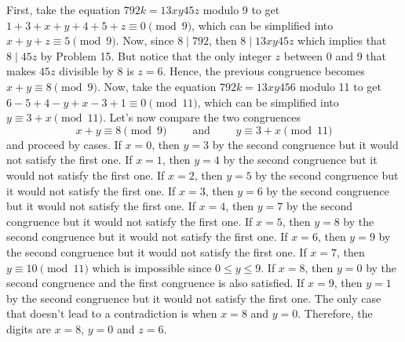 \begin{solution}
    First, take the equation $792k = 13xy45z$ modulo 9 to get $1 + 3 + x + y + 4 + 5 + z \equiv 0 \pmod 9$, which can be simplified into $x + y + z \equiv 5 \pmod 9$. Now, since $8 \mid 792$, then $8 \mid 13xy45z$ which implies that $8 \mid 45z$ by Problem 15. But notice that the only integer $z$ between 0 and 9 that makes $45z$ divisible by 8 is $z = 6$. Hence, the previous congruence becomes $x + y \equiv 8 \pmod 9$. Now, take the equation $792k = 13xy456$ modulo 11 to get $6 - 5 + 4 - y + x - 3 + 1 \equiv 0 \pmod{11}$, which can be simplified into $y \equiv 3 + x \pmod{11}$. Let's now compare the two congruences
    $$x + y \equiv 8 \pmod 9 \qquad \text{ and } \qquad y \equiv 3 + x \pmod{11}$$
    and proceed by cases. If $x = 0$, then $y = 3$ by the second congruence but it would not satisfy the first one. If $x = 1$, then $y = 4$ by the second congruence but it would not satisfy the first one. If $x = 2$, then $y = 5$ by the second congruence but it would not satisfy the first one. If $x = 3$, then $y = 6$ by the second congruence but it would not satisfy the first one. If $x = 4$, then $y = 7$ by the second congruence but it would not satisfy the first one. If $x = 5$, then $y = 8$ by the second congruence but it would not satisfy the first one. If $x = 6$, then $y = 9$ by the second congruence but it would not satisfy the first one. If $x = 7$, then $y \equiv 10 \pmod{11}$ which is impossible since $0 \leq y \leq 9$. If $x = 8$, then $y = 0$ by the second congruence and the first congruence is also satisfied. If $x = 9$, then $y = 1$ by the second congruence but it would not satisfy the first one. The only case that doesn't lead to a contradiction is when $x = 8$ and $y = 0$. Therefore, the digits are $x = 8$, $y = 0$ and $z = 6$. 
\end{solution}